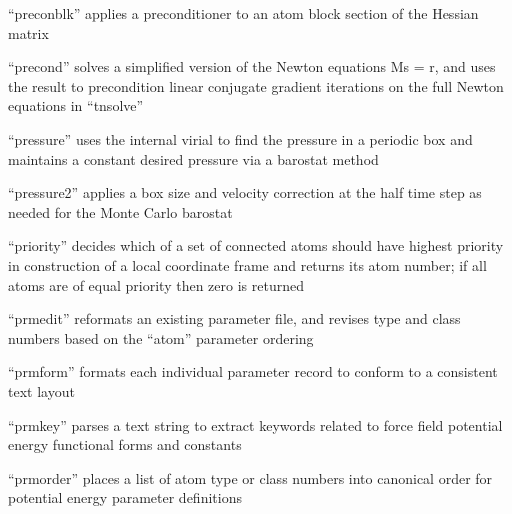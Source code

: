 \documentclass[letterpaper,11pt,english]{sphinxmanual}
\begin{document}
\sphinxAtStartPar
“preconblk” applies a preconditioner to an atom block section of the Hessian matrix

\sphinxAtStartPar
{}

\sphinxAtStartPar
“precond” solves a simplified version of the Newton equations Ms = r, and uses the result to precondition linear conjugate gradient iterations on the full Newton equations in “tnsolve”

\sphinxAtStartPar
{}

\sphinxAtStartPar
“pressure” uses the internal virial to find the pressure in a periodic box and maintains a constant desired pressure via a barostat method

\sphinxAtStartPar
{}

\sphinxAtStartPar
“pressure2” applies a box size and velocity correction at the half time step as needed for the Monte Carlo barostat

\sphinxAtStartPar
{}

\sphinxAtStartPar
“priority” decides which of a set of connected atoms should have highest priority in construction of a local coordinate frame and returns its atom number; if all atoms are of equal priority then zero is returned

\sphinxAtStartPar
{}

\sphinxAtStartPar
“prmedit” reformats an existing parameter file, and revises type and class numbers based on the “atom” parameter ordering

\sphinxAtStartPar
{}

\sphinxAtStartPar
“prmform” formats each individual parameter record to conform to a consistent text layout

\sphinxAtStartPar
{}

\sphinxAtStartPar
“prmkey” parses a text string to extract keywords related to force field potential energy functional forms and constants

\sphinxAtStartPar
{}

\sphinxAtStartPar
“prmorder” places a list of atom type or class numbers into canonical order for potential energy parameter definitions

\sphinxAtStartPar
{}
\end{document}
